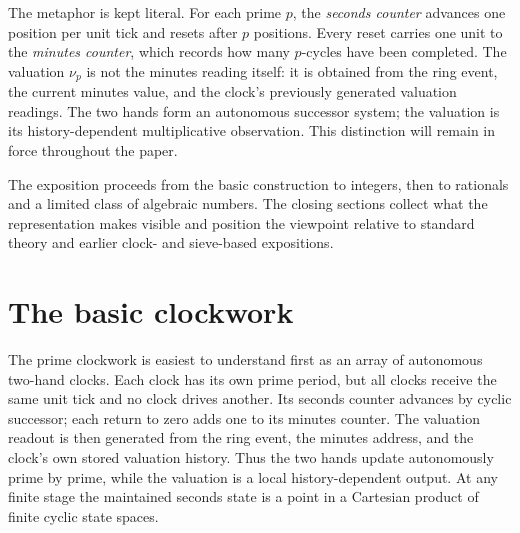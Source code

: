\documentclass[11pt,a4paper]{article}
\theoremstyle{clockplain}
\theoremstyle{definition}
\theoremstyle{remark}
\begin{document}
The metaphor is kept literal. For each prime $p$, the \emph{seconds counter} advances one position per unit tick and resets after $p$ positions. Every reset carries one unit to the \emph{minutes counter}, which records how many $p$-cycles have been completed. The valuation $\nu_p$ is not the minutes reading itself: it is obtained from the ring event, the current minutes value, and the clock's previously generated valuation readings. The two hands form an autonomous successor system; the valuation is its history-dependent multiplicative observation. This distinction will remain in force throughout the paper.

The exposition proceeds from the basic construction to integers, then to rationals and a limited class of algebraic numbers. The closing sections collect what the representation makes visible and position the viewpoint relative to standard theory and earlier clock- and sieve-based expositions.

\section{The basic clockwork}

The prime clockwork is easiest to understand first as an array of autonomous two-hand clocks. Each clock has its own prime period, but all clocks receive the same unit tick and no clock drives another. Its seconds counter advances by cyclic successor; each return to zero adds one to its minutes counter. The valuation readout is then generated from the ring event, the minutes address, and the clock's own stored valuation history. Thus the two hands update autonomously prime by prime, while the valuation is a local history-dependent output. At any finite stage the maintained seconds state is a point in a Cartesian product of finite cyclic state spaces.
\end{document}
